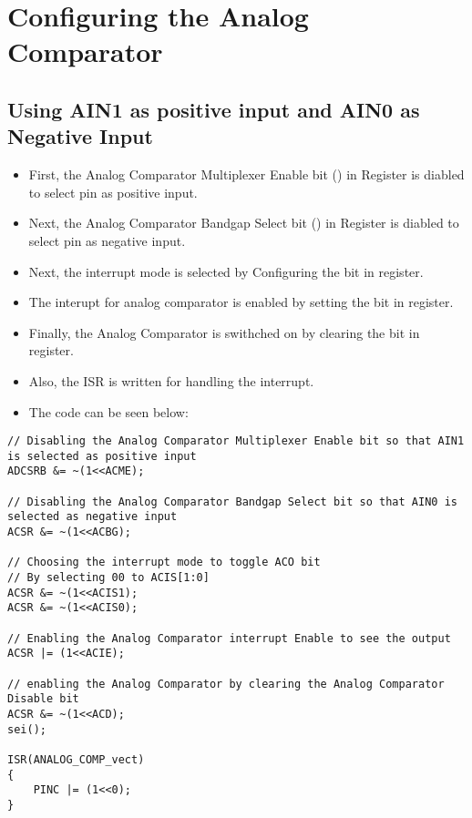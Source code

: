 \section{Configuring the Analog Comparator}
\subsection{Using AIN1 as positive input and AIN0 as Negative Input}
\begin{itemize}
    \item First, the Analog Comparator Multiplexer Enable bit () in  Register is diabled to select  pin as positive input.
    \item Next, the Analog Comparator Bandgap Select bit () in  Register is diabled to select  pin as negative input.
    \item Next, the interrupt mode is selected by Configuring the  bit in  register.
    \item The interupt for analog comparator is enabled by setting the  bit in  register.
    \item Finally, the Analog Comparator is swithched on by clearing the  bit in  register.
    \item Also, the ISR is written for handling the interrupt.
    \item The code can be seen below:
\end{itemize}

\begin{verbatim}
// Disabling the Analog Comparator Multiplexer Enable bit so that AIN1 is selected as positive input
ADCSRB &= ~(1<<ACME);

// Disabling the Analog Comparator Bandgap Select bit so that AIN0 is selected as negative input
ACSR &= ~(1<<ACBG);

// Choosing the interrupt mode to toggle ACO bit 
// By selecting 00 to ACIS[1:0]
ACSR &= ~(1<<ACIS1);
ACSR &= ~(1<<ACIS0);

// Enabling the Analog Comparator interrupt Enable to see the output
ACSR |= (1<<ACIE);

// enabling the Analog Comparator by clearing the Analog Comparator Disable bit
ACSR &= ~(1<<ACD);
sei();

ISR(ANALOG_COMP_vect)
{
    PINC |= (1<<0);
}
\end{verbatim}
% 
